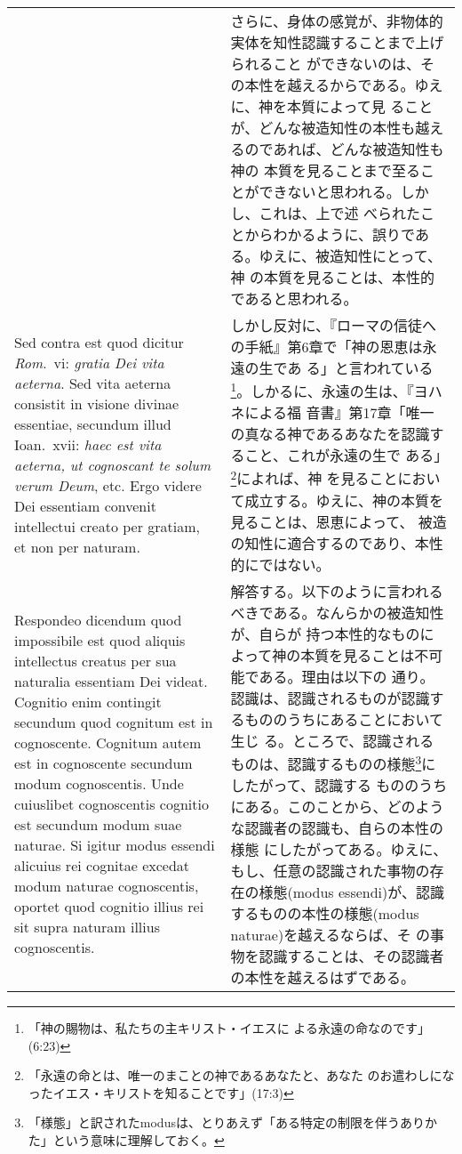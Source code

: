 \documentclass[10pt]{jsarticle} %
\begin{document}
\begin{longtable}{p{21em}p{21em}}
&

さらに、身体の感覚が、非物体的実体を知性認識することまで上げられること
ができないのは、その本性を越えるからである。ゆえに、神を本質によって見
ることが、どんな被造知性の本性も越えるのであれば、どんな被造知性も神の
本質を見ることまで至ることができないと思われる。しかし、これは、上で述
べられたことからわかるように、誤りである。ゆえに、被造知性にとって、神
の本質を見ることは、本性的であると思われる。

\\

{\sc Sed contra est} quod dicitur {\it Rom}.\ {\sc vi}: {\it gratia
Dei vita aeterna}. Sed vita aeterna consistit in visione divinae
essentiae, secundum illud Ioan.\ {\sc xvii}: {\it haec est vita
aeterna, ut cognoscant te solum verum Deum}, etc. Ergo videre Dei
essentiam convenit intellectui creato per gratiam, et non per naturam.

&

しかし反対に、『ローマの信徒への手紙』第6章で「神の恩恵は永遠の生であ
る」と言われている\footnote{「神の賜物は、私たちの主キリスト・イエスに
よる永遠の命なのです」(6:23)}。しかるに、永遠の生は、『ヨハネによる福
音書』第17章「唯一の真なる神であるあなたを認識すること、これが永遠の生で
ある」\footnote{「永遠の命とは、唯一のまことの神であるあなたと、あなた
のお遣わしになったイエス・キリストを知ることです」(17:3)}によれば、神
を見ることにおいて成立する。ゆえに、神の本質を見ることは、恩恵によって、
被造の知性に適合するのであり、本性的にではない。

\\

{\sc Respondeo dicendum} quod impossibile est quod aliquis intellectus
creatus per sua naturalia essentiam Dei videat. Cognitio enim
contingit secundum quod cognitum est in cognoscente. Cognitum autem
est in cognoscente secundum modum cognoscentis. Unde cuiuslibet
cognoscentis cognitio est secundum modum suae naturae. Si igitur modus
essendi alicuius rei cognitae excedat modum naturae cognoscentis,
oportet quod cognitio illius rei sit supra naturam illius
cognoscentis.

&

解答する。以下のように言われるべきである。なんらかの被造知性が、自らが
持つ本性的なものによって神の本質を見ることは不可能である。理由は以下の
通り。認識は、認識されるものが認識するもののうちにあることにおいて生じ
る。ところで、認識されるものは、認識するものの様態\footnote{「様態」と訳されたmodusは、とりあえず「ある特定の制限を伴うありかた」という意味に理解しておく。}にしたがって、認識する
もののうちにある。このことから、どのような認識者の認識も、自らの本性の様態
にしたがってある。ゆえに、もし、任意の認識された事物の存在の様態(modus
essendi)が、認識するものの本性の様態(modus naturae)を越えるならば、そ
の事物を認識することは、その認識者の本性を越えるはずである。


\end{longtable}
\end{document}
